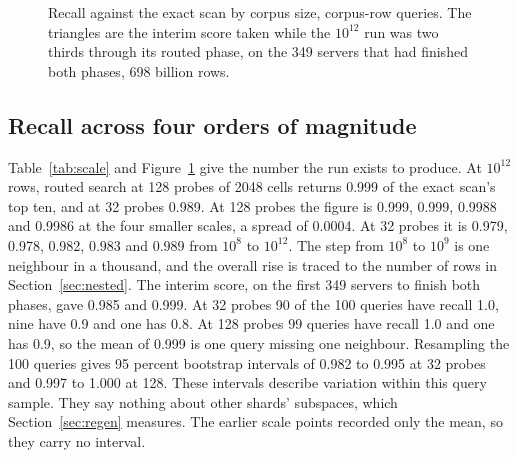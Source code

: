 \documentclass[sigconf, nonacm]{acmart}
\begin{document}
\begin{figure}[t]
\centering
{}
\caption{Recall against the exact scan by corpus size, corpus-row queries. The triangles are the
interim score taken while the $10^{12}$ run was two thirds through its routed phase, on the 349
servers that had finished both phases, 698 billion rows.}
\label{fig:scale}
\end{figure}

\subsection{Recall across four orders of magnitude}

Table~\ref{tab:scale} and Figure~\ref{fig:scale} give the number the run exists to produce. At
$10^{12}$ rows, routed search at 128 probes of 2048 cells returns 0.999 of the exact scan's top
ten, and at 32 probes 0.989. At 128 probes the figure is 0.999, 0.999, 0.9988 and 0.9986 at the
four smaller scales, a spread of 0.0004. At 32 probes it is 0.979, 0.978, 0.982, 0.983 and 0.989
from $10^{8}$ to $10^{12}$. The step from $10^{8}$ to $10^{9}$ is one neighbour in a thousand, and
the overall rise is traced to the number of rows in Section~\ref{sec:nested}. The interim score, on
the first 349 servers to finish both phases, gave 0.985 and 0.999. At 32 probes 90 of the 100
queries have recall 1.0, nine have 0.9 and one has 0.8. At 128 probes 99 queries have recall 1.0
and one has 0.9, so the mean of 0.999 is one query missing one neighbour. Resampling the 100
queries gives 95 percent bootstrap intervals of 0.982 to 0.995 at 32 probes and 0.997 to 1.000 at
128. These intervals describe variation within this query sample. They say nothing about other
shards' subspaces, which Section~\ref{sec:regen} measures. The earlier scale points recorded only
the mean, so they carry no interval.
\end{document}
